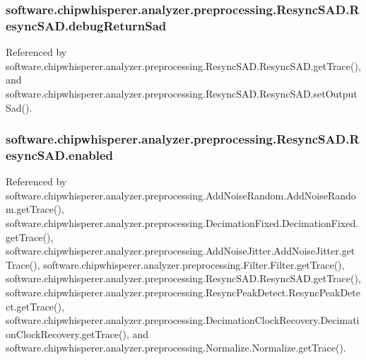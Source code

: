 \subsubsection[{debug\+Return\+Sad}]{\setlength{\rightskip}{0pt plus 5cm}software.\+chipwhisperer.\+analyzer.\+preprocessing.\+Resync\+S\+A\+D.\+Resync\+S\+A\+D.\+debug\+Return\+Sad}\label{classsoftware_1_1chipwhisperer_1_1analyzer_1_1preprocessing_1_1ResyncSAD_1_1ResyncSAD_aa6447e8584b1a84a6b2ad2923e18cc1c}


Referenced by software.\+chipwhisperer.\+analyzer.\+preprocessing.\+Resync\+S\+A\+D.\+Resync\+S\+A\+D.\+get\+Trace(), and software.\+chipwhisperer.\+analyzer.\+preprocessing.\+Resync\+S\+A\+D.\+Resync\+S\+A\+D.\+set\+Output\+Sad().

\hypertarget{classsoftware_1_1chipwhisperer_1_1analyzer_1_1preprocessing_1_1ResyncSAD_1_1ResyncSAD_a304d6b656be9ef188c29bffbea7d302e}{}
\subsubsection[{enabled}]{\setlength{\rightskip}{0pt plus 5cm}software.\+chipwhisperer.\+analyzer.\+preprocessing.\+Resync\+S\+A\+D.\+Resync\+S\+A\+D.\+enabled}\label{classsoftware_1_1chipwhisperer_1_1analyzer_1_1preprocessing_1_1ResyncSAD_1_1ResyncSAD_a304d6b656be9ef188c29bffbea7d302e}


Referenced by software.\+chipwhisperer.\+analyzer.\+preprocessing.\+Add\+Noise\+Random.\+Add\+Noise\+Random.\+get\+Trace(), software.\+chipwhisperer.\+analyzer.\+preprocessing.\+Decimation\+Fixed.\+Decimation\+Fixed.\+get\+Trace(), software.\+chipwhisperer.\+analyzer.\+preprocessing.\+Add\+Noise\+Jitter.\+Add\+Noise\+Jitter.\+get\+Trace(), software.\+chipwhisperer.\+analyzer.\+preprocessing.\+Filter.\+Filter.\+get\+Trace(), software.\+chipwhisperer.\+analyzer.\+preprocessing.\+Resync\+S\+A\+D.\+Resync\+S\+A\+D.\+get\+Trace(), software.\+chipwhisperer.\+analyzer.\+preprocessing.\+Resync\+Peak\+Detect.\+Resync\+Peak\+Detect.\+get\+Trace(), software.\+chipwhisperer.\+analyzer.\+preprocessing.\+Decimation\+Clock\+Recovery.\+Decimation\+Clock\+Recovery.\+get\+Trace(), and software.\+chipwhisperer.\+analyzer.\+preprocessing.\+Normalize.\+Normalize.\+get\+Trace().


